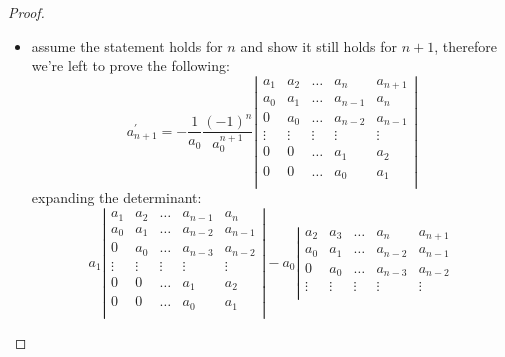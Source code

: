 \documentclass[11pt,a4paper]{article} %
\begin{document}
\begin{proof}
\begin{itemize}
        \item assume the statement holds for $n$ and show it still holds for $n+1$, therefore
            we're left to prove the following:
        \begin{displaymath}                
            a_{n+1}^{\prime} = 
                -\frac{1}{a_{0}}\frac{(-1)^{n}}{a_{0}^{n+1}}
                \left|
                \begin{array}{ccccc}
                    a_1 & a_2 & \ldots & a_{n} & a_{n+1}\\
                    a_0 & a_1 & \ldots & a_{n-1} & a_{n}\\
                    0   & a_0 & \ldots & a_{n-2} & a_{n-1}\\
                    \vdots & \vdots & \vdots & \vdots & \vdots\\
                    0 & 0 & \ldots & a_{1} & a_{2}\\
                    0 & 0 & \ldots & a_{0} & a_{1}\\
                \end{array}
                \right|
        \end{displaymath}                
        expanding the determinant:
        \begin{displaymath}                
            a_{1}
                \left|
                \begin{array}{ccccc}
                    a_1 & a_2 & \ldots & a_{n-1} & a_{n}\\
                    a_0 & a_1 & \ldots & a_{n-2} & a_{n-1}\\
                    0   & a_0 & \ldots & a_{n-3} & a_{n-2}\\
                    \vdots & \vdots & \vdots & \vdots & \vdots\\
                    0 & 0 & \ldots & a_{1} & a_{2}\\
                    0 & 0 & \ldots & a_{0} & a_{1}\\
                \end{array}
                \right|
            - a_{0}
                \left|
                \begin{array}{ccccc}
                    a_2 & a_3 & \ldots & a_{n} & a_{n+1}\\
                    a_0 & a_1 & \ldots & a_{n-2} & a_{n-1}\\
                    0   & a_0 & \ldots & a_{n-3} & a_{n-2}\\
                    \vdots & \vdots & \vdots & \vdots & \vdots\\

\end{array}
\end{displaymath}
\end{itemize}
\end{proof}
\end{document}
